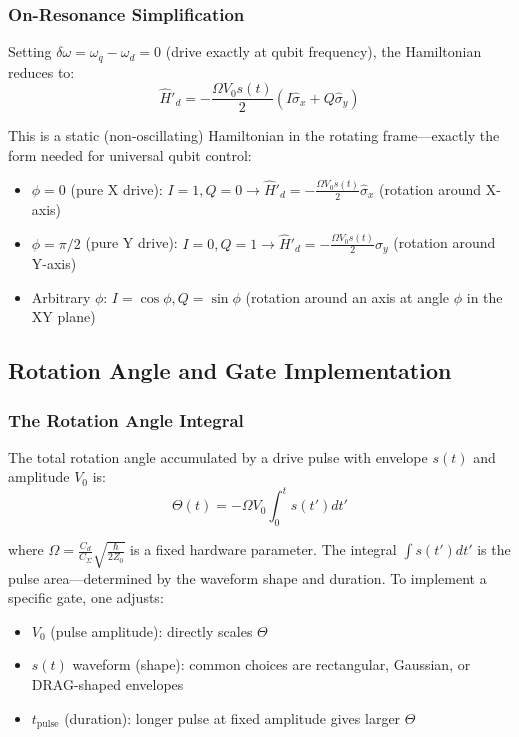 \documentclass{article}
\begin{document}
\subsubsection*{On-Resonance Simplification}

Setting $\delta\omega = \omega_q - \omega_d = 0$ (drive exactly at qubit frequency), the Hamiltonian reduces to:
$$\hat{H}'_d = -\frac{\Omega V_0 s(t)}{2} (I \hat{\sigma}_x + Q \hat{\sigma}_y)$$

This is a static (non-oscillating) Hamiltonian in the rotating frame—exactly the form needed for universal qubit control:

\begin{itemize}
    \item $\phi = 0$ (pure X drive): $I = 1, Q = 0 \to \hat{H}'_d = -\frac{\Omega V_0 s(t)}{2} \hat{\sigma}_x$ (rotation around X-axis)
    \item $\phi = \pi/2$ (pure Y drive): $I = 0, Q = 1 \to \hat{H}'_d = -\frac{\Omega V_0 s(t)}{2} \hat{\sigma}_y$ (rotation around Y-axis)
    \item Arbitrary $\phi$: $I = \cos\phi, Q = \sin\phi$ (rotation around an axis at angle $\phi$ in the XY plane)
\end{itemize}

\subsection{Rotation Angle and Gate Implementation}

\subsubsection*{The Rotation Angle Integral}

The total rotation angle accumulated by a drive pulse with envelope $s(t)$ and amplitude $V_0$ is:
$$\Theta(t) = -\Omega V_0 \int_0^t s(t') dt'$$

where $\Omega = \frac{C_d}{C_\Sigma}\sqrt{\frac{\hbar}{2Z_0}}$ is a fixed hardware parameter. The integral $\int s(t') dt'$ is the pulse area—determined by the waveform shape and duration. To implement a specific gate, one adjusts:

\begin{itemize}
    \item $V_0$ (pulse amplitude): directly scales $\Theta$
    \item $s(t)$ waveform (shape): common choices are rectangular, Gaussian, or DRAG-shaped envelopes
    \item $t_{\text{pulse}}$ (duration): longer pulse at fixed amplitude gives larger $\Theta$
\end{itemize}
\end{document}
